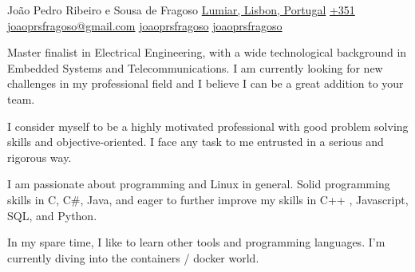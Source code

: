 \documentclass[11pt, a4paper]{cv}
\begin{document}

\begin{minipage}{0.35\linewidth}
	\photo{1.5cm}
\end{minipage}\hfil
\begin{minipage}{0.55\linewidth}
	\begin{minipage}{0.1\linewidth}
		\begin{center}
			\faUser \newline
			\faMapMarker \newline
			\faMobile \newline
			\faEnvelopeO \newline
			\faLinkedinSquare \newline
			\faSkype \newline
		\end{center}
	\end{minipage}\hfil
	\begin{minipage}{0.9\linewidth}
		João Pedro Ribeiro e Sousa de Fragoso \newline
		\href{https://www.google.com/maps/place/Lumiar,+Lisbon,+Portugal}{Lumiar, Lisbon, Portugal} \newline
		\href{callto://+351924429083}{+351 } \newline
		\href{mailto://joaoprsfragoso@gmail.com}{joaoprsfragoso@gmail.com} \newline
		\href{https://www.linkedin.com/in/joaoprsfragoso/}{joaoprsfragoso} \newline
		\href{skype://joaoprsfragoso}{joaoprsfragoso} \newline
	\end{minipage}
\end{minipage}


\aboutme
{

	\faQuoteLeft \space Master finalist in Electrical Engineering, with a wide technological background in Embedded Systems and Telecommunications. I am currently looking for new challenges in my professional field and I believe I can be a great addition to your team.

	I consider myself to be a highly motivated professional with good problem solving skills and objective-oriented. I face any task to me entrusted in a serious and rigorous way.

	I am passionate about programming and Linux in general. Solid programming skills in C, C\#, Java, and eager to further improve my skills in C++ , Javascript, SQL, and Python. 

	In my spare time, I like to learn other tools and programming languages. I'm currently diving into the containers / docker world. \faQuoteRight

}
\end{document}
